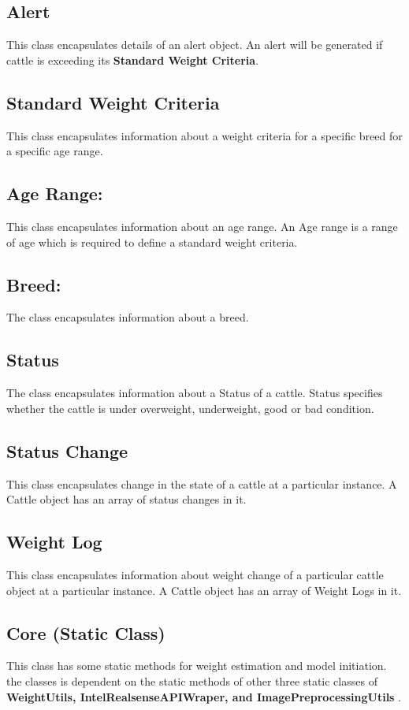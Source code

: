 \subsection{Alert}
This class encapsulates details of an alert object. An alert will be generated if cattle is exceeding its \textbf{Standard Weight Criteria}.  

\subsection{Standard Weight Criteria}
This class encapsulates information about a weight criteria for a specific breed for a specific age range. 

\subsection{Age Range:}
This class encapsulates information about an age range. An Age range is a range of age which is required to define a standard weight criteria.

\subsection{Breed:}
The class encapsulates information about a breed. 

\subsection{Status}
The class encapsulates information about a Status of a cattle. Status specifies whether the cattle is under overweight, underweight, good or bad condition.

\subsection{Status Change}
This class encapsulates change in the state of a cattle at a particular instance. A Cattle object has an array of status changes in it. 

\subsection{Weight Log}
This class encapsulates information about weight change of a particular cattle object at a particular instance. A Cattle object has an array of Weight Logs in it. 

\subsection{Core (Static Class)}
This class has some static methods for weight estimation and model initiation. the classes is dependent on the static methods of other three static classes of \textbf{WeightUtils, IntelRealsenseAPIWraper, and ImagePreprocessingUtils} .


